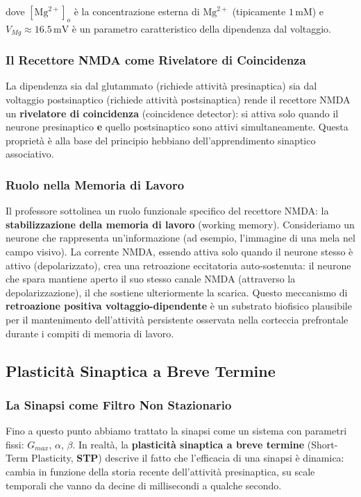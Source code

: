 dove $[\text{Mg}^{2+}]_o$ è la concentrazione esterna di $\text{Mg}^{2+}$ (tipicamente $1 \, \text{mM}$) e $V_{Mg} \approx 16.5 \, \text{mV}$ è un parametro caratteristico della dipendenza dal voltaggio.


\subsubsection{Il Recettore NMDA come Rivelatore di Coincidenza}

La dipendenza sia dal glutammato (richiede attività presinaptica) sia dal voltaggio postsinaptico (richiede attività postsinaptica) rende il recettore NMDA un \textbf{rivelatore di coincidenza} (coincidence detector): si attiva solo quando il neurone presinaptico \textbf{e} quello postsinaptico sono attivi simultaneamente. Questa proprietà è alla base del principio hebbiano dell'apprendimento sinaptico associativo.

\subsubsection{Ruolo nella Memoria di Lavoro}

Il professore sottolinea un ruolo funzionale specifico del recettore NMDA: la \textbf{stabilizzazione della memoria di lavoro} (working memory). Consideriamo un neurone che rappresenta un'informazione (ad esempio, l'immagine di una mela nel campo visivo). La corrente NMDA, essendo attiva solo quando il neurone stesso è attivo (depolarizzato), crea una retroazione eccitatoria auto-sostenuta: il neurone che spara mantiene aperto il suo stesso canale NMDA (attraverso la depolarizzazione), il che sostiene ulteriormente la scarica. Questo meccanismo di \textbf{retroazione positiva voltaggio-dipendente} è un substrato biofisico plausibile per il mantenimento dell'attività persistente osservata nella corteccia prefrontale durante i compiti di memoria di lavoro.



\subsection{Plasticità Sinaptica a Breve Termine}

\subsubsection{La Sinapsi come Filtro Non Stazionario}

Fino a questo punto abbiamo trattato la sinapsi come un sistema con parametri fissi: $G_{max}$, $\alpha$, $\beta$. In realtà, la \textbf{plasticità sinaptica a breve termine} (Short-Term Plasticity, \textbf{STP}) descrive il fatto che l'efficacia di una sinapsi è dinamica: cambia in funzione della storia recente dell'attività presinaptica, su scale temporali che vanno da decine di millisecondi a qualche secondo.

